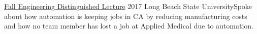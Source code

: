 
\WorkEntry
  {\href{https://web.csulb.edu/colleges/coe/news/?p=12093}{Fall Engineering Distinguished Lecture}}
  {2017}
  {Long Beach State University}{Spoke about how automation is keeping jobs in CA by reducing manufacturing costs and how no team member has lost a job at Applied Medical due to automation.}
